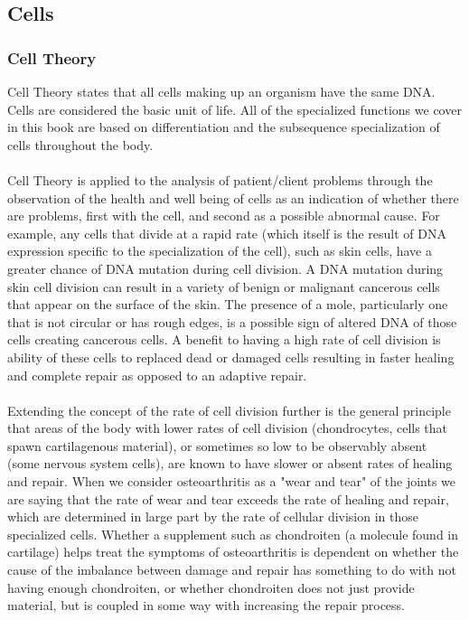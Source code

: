 \subsection{Cells}

\subsubsection{Cell Theory}

Cell Theory states that all cells making up an organism have the same DNA. Cells are considered the basic unit of life. All of the specialized functions we cover in this book are based on differentiation and the subsequence specialization of cells throughout the body.   
\paragraph{}
Cell Theory is applied to the analysis of patient/client problems through the observation of the health and well being of cells as an indication of whether there are problems, first with the cell, and second as a possible abnormal cause. For example, any cells that divide at a rapid rate (which itself is the result of DNA expression specific to the specialization of the cell), such as skin cells, have a greater chance of DNA mutation during cell division. A DNA mutation during skin cell division can result in a variety of benign or malignant cancerous cells that appear on the surface of the skin. The presence of a mole, particularly one that is not circular or has rough edges, is a possible sign of altered DNA of those cells creating cancerous cells. A benefit to having a high rate of cell division is ability of these cells to replaced dead or damaged cells resulting in faster healing and complete repair as opposed to an adaptive repair.

\paragraph{}
Extending the concept of the rate of cell division further is the general principle that areas of the body with lower rates of cell division (chondrocytes, cells that spawn cartilagenous material), or sometimes so low to be observably absent (some nervous system cells), are known to have slower or absent rates of healing and repair. When we consider osteoarthritis as a "wear and tear" of the joints we are saying that the rate of wear and tear exceeds the rate of healing and repair, which are determined in large part by the rate of cellular division in those specialized cells. Whether a supplement such as chondroiten (a molecule found in cartilage) helps treat the symptoms of osteoarthritis is dependent on whether the cause of the imbalance between damage and repair has something to do with not having enough chondroiten, or whether chondroiten does not just provide material, but is coupled in some way with increasing the repair process.
 
